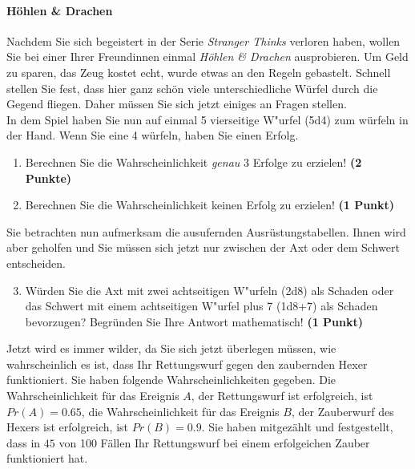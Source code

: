 \documentclass[a4paper, 10pt]{scrartcl}\usepackage[]{graphicx}\usepackage[]{xcolor}
\begin{document}
\paragraph{H{\"o}hlen \& Drachen}



Nachdem Sie sich begeistert in der Serie \textit{Stranger Thinks} verloren
haben, wollen Sie bei einer Ihrer Freundinnen einmal \textit{H{\"o}hlen \& Drachen}
ausprobieren. Um Geld zu sparen, das Zeug kostet echt, wurde etwas an den
Regeln gebastelt. Schnell stellen Sie fest, dass hier ganz sch{\"o}n viele
unterschiedliche W{\"u}rfel durch die Gegend fliegen. Daher m{\"u}ssen Sie sich
jetzt einiges an Fragen stellen. \\%

In dem Spiel haben Sie nun auf einmal 5 vierseitige W{"u}rfel (5d4) zum w{\"u}rfeln in der Hand. Wenn Sie eine 4 w{\"u}rfeln,
haben Sie einen Erfolg.

\begin{enumerate}
\item Berechnen Sie die Wahrscheinlichkeit \textit{genau}
  3 Erfolge zu erzielen!  \textbf{(2 Punkte)}
\item Berechnen Sie die Wahrscheinlichkeit keinen Erfolg zu erzielen!
  \textbf{(1 Punkt)}
\end{enumerate}

Sie betrachten nun aufmerksam die ausufernden Ausr{\"u}stungstabellen. Ihnen
wird aber geholfen und Sie m{\"u}ssen sich jetzt nur zwischen der Axt oder dem
Schwert entscheiden.

\begin{enumerate}
  \setcounter{enumi}{2}
\item W{\"u}rden Sie die Axt mit zwei achtseitigen W{"u}rfeln (2d8) als Schaden oder
  das Schwert mit einem achtseitigen W{"u}rfel plus 7 (1d8+7) als Schaden bevorzugen?
  Begr{\"u}nden Sie Ihre Antwort mathematisch! \textbf{(1 Punkt)}
\end{enumerate}

Jetzt wird es immer wilder, da Sie sich jetzt {\"u}berlegen m{\"u}ssen, wie
wahrscheinlich es ist, dass Ihr Rettungswurf gegen den zaubernden Hexer
funktioniert. Sie haben folgende Wahrscheinlichkeiten gegeben. Die
Wahrscheinlichkeit f{\"u}r das Ereignis $A$, der Rettungswurf ist erfolgreich,
ist $Pr(A) = 0.65$, die Wahrscheinlichkeit f{\"u}r das Ereignis $B$,
der Zauberwurf des Hexers ist erfolgreich, ist $Pr(B) = 0.9$. Sie
haben mitgez{\"a}hlt und festgestellt, dass in $45$ von 100 F{\"a}llen
Ihr Rettungswurf bei einem erfolgeichen Zauber funktioniert hat.  
\end{document}

